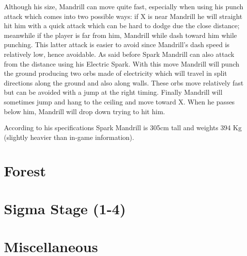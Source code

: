Although his size, Mandrill can move quite fast, especially when using his punch attack which comes into two possible ways\cite{wiki:Spark_mandrill}: if X is near Mandrill he will straight hit him with a quick attack which can be hard to dodge due the close distance; meanwhile if the player is far from him, Mandrill while dash toward him while punching. This latter attack is easier to avoid since Mandrill's dash speed is relatively low, hence avoidable.  As said before Spark Mandrill can also attack from the distance using his Electric Spark. With this move Mandrill will punch the ground producing two orbs made of electricity which will travel in split directions along the ground and also along walls. These orbs move relatively fast but can be avoided with a jump at the right timing. Finally Mandrill will sometimes jump and hang to the ceiling and move toward X. When he passes below him, Mandrill will drop down trying to hit him.

According to his specifications Spark Mandrill is 305cm tall and weights 394 Kg (slightly heavier than in-game information).
\section{Forest}
\section{Sigma Stage (1-4)}
\section{Miscellaneous}\label{X1:misc} %